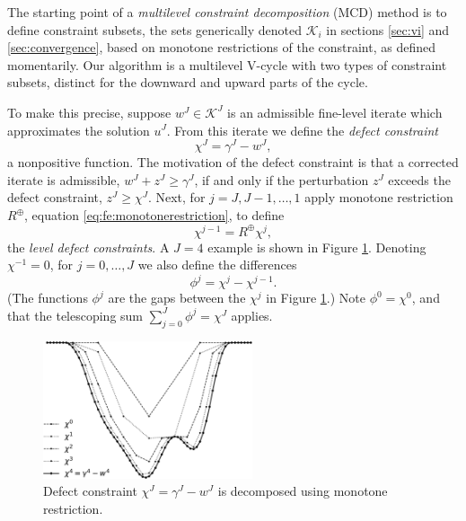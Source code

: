 \documentclass[letterpaper,final,12pt,reqno]{amsart}
\theoremstyle{cstyle}
\theoremstyle{cstyle*}
\theoremstyle{dstyle}
\numberwithin{equation}{section}
\numberwithin{figure}{section}
\numberwithin{table}{section}
\numberwithin{theorem}{section}
\newcommand{\cK}{\mathcal{K}}
\newcommand{\mR}{R^{\bm{\oplus}}}
\begin{document}
The starting point of a \emph{multilevel constraint decomposition} (MCD) \cite{GraeserKornhuber2009,Tai2003} method is to define constraint subsets, the sets generically denoted $\cK_i$ in sections \ref{sec:vi} and \ref{sec:convergence}, based on monotone restrictions of the constraint, as defined momentarily.  Our algorithm is a multilevel V-cycle with two types of constraint subsets, distinct for the downward and upward parts of the cycle.

To make this precise, suppose $w^J \in \cK^J$ is an admissible fine-level iterate which approximates the solution $u^J$.  From this iterate we define the \emph{defect constraint} \cite{GraeserKornhuber2009}
\begin{equation}
\chi^J = \gamma^J - w^J,  \label{eq:fe:defectconstraintfcn}
\end{equation}
a nonpositive function.  The motivation of the defect constraint is that a corrected iterate is admissible, $w^J + z^J \ge \gamma^J$, if and only if the perturbation $z^J$ exceeds the defect constraint, $z^J \ge \chi^J$.  Next, for $j=J,J-1,\dots,1$ apply monotone restriction $\mR$, equation \eqref{eq:fe:monotonerestriction}, to define
\begin{equation}
\chi^{j-1} = \mR \chi^j, \label{eq:fe:chilevels}
\end{equation}
the \emph{level defect constraints}.  A $J=4$ example is shown in Figure \ref{fig:chiphilevels}.  Denoting $\chi^{-1}=0$, for $j=0,\dots,J$ we also define the differences
\begin{equation}
\phi^j = \chi^j - \chi^{j-1}. \label{eq:fe:philevels}
\end{equation}
(The functions $\phi^j$ are the gaps between the $\chi^j$ in Figure \ref{fig:chiphilevels}.)  Note $\phi^0=\chi^0$, and that the telescoping sum $\sum_{j=0}^J \phi^j = \chi^J$ applies.

\begin{figure}
\includegraphics[width=0.55\textwidth]{fixfigs/chiphilevels.pdf}
\caption{Defect constraint $\chi^J = \gamma^J - w^J$ is decomposed using monotone restriction.}
\label{fig:chiphilevels}
\end{figure}
\end{document}
